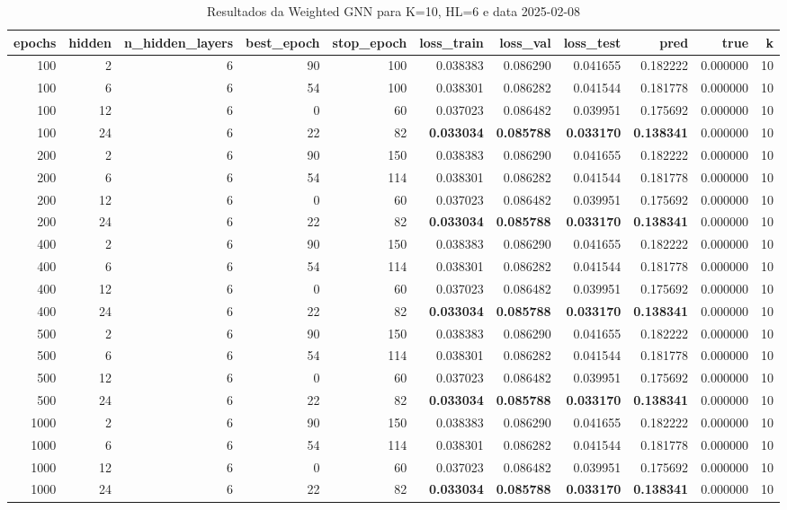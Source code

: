 \begin{table}
\caption{Resultados da Weighted GNN para K=10, HL=6 e data 2025-02-08}
\label{tab:weighted_gnn_results_k10_hl6_d20250208}
\begin{tabular}{rrrrrrrrrrr}
\toprule
epochs & hidden & n\_hidden\_layers & best\_epoch & stop\_epoch & loss\_train & loss\_val & loss\_test & pred & true & k \\
\midrule
100 & 2 & 6 & 90 & 100 & 0.038383 & 0.086290 & 0.041655 & 0.182222 & 0.000000 & 10 \\
100 & 6 & 6 & 54 & 100 & 0.038301 & 0.086282 & 0.041544 & 0.181778 & 0.000000 & 10 \\
100 & 12 & 6 & 0 & 60 & 0.037023 & 0.086482 & 0.039951 & 0.175692 & 0.000000 & 10 \\
100 & 24 & 6 & 22 & 82 & \textbf{0.033034} & \textbf{0.085788} & \textbf{0.033170} & \textbf{0.138341} & 0.000000 & 10 \\
200 & 2 & 6 & 90 & 150 & 0.038383 & 0.086290 & 0.041655 & 0.182222 & 0.000000 & 10 \\
200 & 6 & 6 & 54 & 114 & 0.038301 & 0.086282 & 0.041544 & 0.181778 & 0.000000 & 10 \\
200 & 12 & 6 & 0 & 60 & 0.037023 & 0.086482 & 0.039951 & 0.175692 & 0.000000 & 10 \\
200 & 24 & 6 & 22 & 82 & \textbf{0.033034} & \textbf{0.085788} & \textbf{0.033170} & \textbf{0.138341} & 0.000000 & 10 \\
400 & 2 & 6 & 90 & 150 & 0.038383 & 0.086290 & 0.041655 & 0.182222 & 0.000000 & 10 \\
400 & 6 & 6 & 54 & 114 & 0.038301 & 0.086282 & 0.041544 & 0.181778 & 0.000000 & 10 \\
400 & 12 & 6 & 0 & 60 & 0.037023 & 0.086482 & 0.039951 & 0.175692 & 0.000000 & 10 \\
400 & 24 & 6 & 22 & 82 & \textbf{0.033034} & \textbf{0.085788} & \textbf{0.033170} & \textbf{0.138341} & 0.000000 & 10 \\
500 & 2 & 6 & 90 & 150 & 0.038383 & 0.086290 & 0.041655 & 0.182222 & 0.000000 & 10 \\
500 & 6 & 6 & 54 & 114 & 0.038301 & 0.086282 & 0.041544 & 0.181778 & 0.000000 & 10 \\
500 & 12 & 6 & 0 & 60 & 0.037023 & 0.086482 & 0.039951 & 0.175692 & 0.000000 & 10 \\
500 & 24 & 6 & 22 & 82 & \textbf{0.033034} & \textbf{0.085788} & \textbf{0.033170} & \textbf{0.138341} & 0.000000 & 10 \\
1000 & 2 & 6 & 90 & 150 & 0.038383 & 0.086290 & 0.041655 & 0.182222 & 0.000000 & 10 \\
1000 & 6 & 6 & 54 & 114 & 0.038301 & 0.086282 & 0.041544 & 0.181778 & 0.000000 & 10 \\
1000 & 12 & 6 & 0 & 60 & 0.037023 & 0.086482 & 0.039951 & 0.175692 & 0.000000 & 10 \\
1000 & 24 & 6 & 22 & 82 & \textbf{0.033034} & \textbf{0.085788} & \textbf{0.033170} & \textbf{0.138341} & 0.000000 & 10 \\
\bottomrule
\end{tabular}
\end{table}

